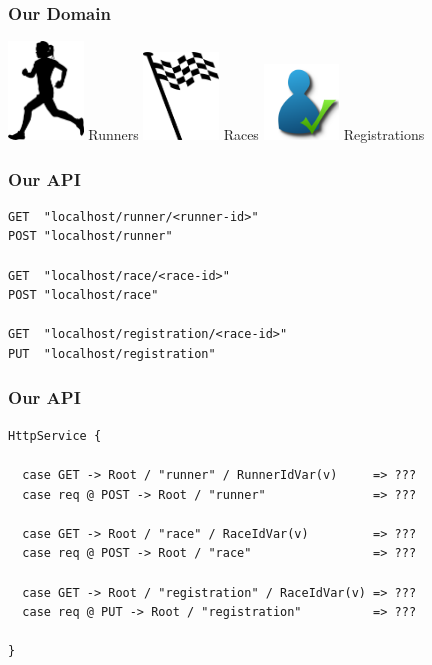 \documentclass{beamer}
\begin{document}
\begin{frame}
  \frametitle{Our Domain}
  \begin{center}
    \huge
    \includegraphics[width=2cm]{../pics/runner.png}
    Runners
    \includegraphics[width=2cm]{../pics/race.png}
    Races
    \includegraphics[width=2cm]{../pics/registration.png}
    Registrations
  \end{center}
\end{frame}

\begin{frame}[fragile]
  \frametitle{Our API}
\begin{verbatim}
GET  "localhost/runner/<runner-id>"
POST "localhost/runner"

GET  "localhost/race/<race-id>"
POST "localhost/race"

GET  "localhost/registration/<race-id>"
PUT  "localhost/registration"
\end{verbatim}
\end{frame}

\begin{frame}[fragile]
  \frametitle{Our API}
\begin{verbatim}
HttpService {

  case GET -> Root / "runner" / RunnerIdVar(v)     => ???
  case req @ POST -> Root / "runner"               => ???

  case GET -> Root / "race" / RaceIdVar(v)         => ???
  case req @ POST -> Root / "race"                 => ???

  case GET -> Root / "registration" / RaceIdVar(v) => ???
  case req @ PUT -> Root / "registration"          => ???

}
\end{verbatim}
\end{frame}
\end{document}
